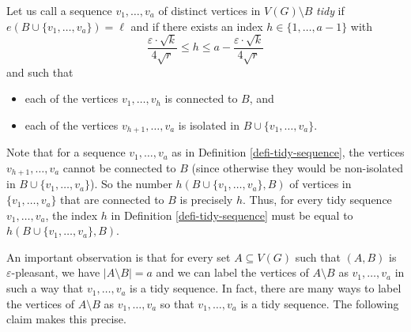 \begin{definition}\label{defi-tidy-sequence} Let us call a sequence $v_1,\dots,v_a$ of distinct vertices in $V(G)\setminus B$ \emph{tidy} if $e(B\cup \lbrace v_1,\dots,v_a\rbrace)=\ell$ and if there exists an index $h\in \lbrace 1,\dots,a-1\rbrace$ with
\[\frac{\varepsilon\cdot \sqrt{k}}{4\sqrt{r}}\leq h\leq a-\frac{\varepsilon\cdot \sqrt{k}}{4\sqrt{r}}\]
and such that
\begin{itemize}
\item each of the vertices $v_1,\dots,v_{h}$ is connected to $B$, and
\item each of the vertices $v_{h+1},\dots,v_{a}$ is isolated in $B\cup \lbrace v_1,\dots,v_a\rbrace$.
\end{itemize}
\end{definition}

Note that for a sequence $v_1,\dots,v_a$ as in Definition \ref{defi-tidy-sequence}, the vertices $v_{h+1},\dots,v_a$ cannot be connected to $B$ (since otherwise they would be non-isolated in $B\cup \lbrace v_1,\dots,v_a\rbrace$). So the number $h(B\cup \lbrace v_1,\dots,v_a\rbrace, B)$ of vertices in $\lbrace v_1,\dots,v_a\rbrace$ that are connected to $B$ is precisely $h$. Thus, for every tidy sequence $v_1,\dots,v_a$, the index $h$ in Definition \ref{defi-tidy-sequence} must be equal to $h(B\cup \lbrace v_1,\dots,v_a\rbrace, B)$.

An important observation is that for every set $A\subseteq V(G)$ such that $(A,B)$ is $\varepsilon$-pleasant, we have $\vert A\setminus B\vert = a$ and we can label the vertices of $A\setminus B$ as $v_1,\dots,v_a$ in such a way that $v_1,\dots,v_a$ is a tidy sequence. In fact, there are many ways to label the vertices of $A\setminus B$ as $v_1,\dots,v_a$ so that $v_1,\dots,v_a$ is a tidy sequence. The following claim makes this precise.

